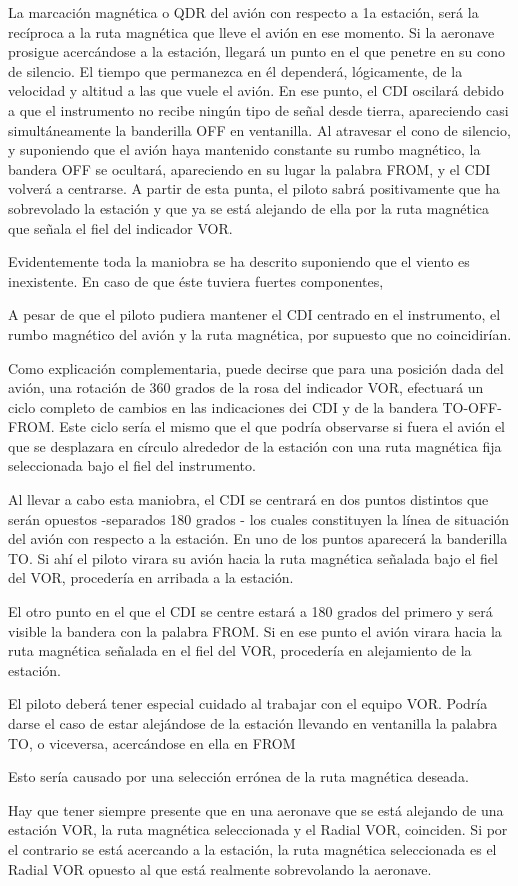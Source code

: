 La marcación magnética o QDR del avión con respecto a 1a estación, será la recíproca a la ruta magnética que lleve el avión en ese momento. Si la aeronave prosigue acercándose a la estación, llegará un punto en el que penetre en su cono de silencio. El tiempo que permanezca en él dependerá, lógicamente, de la velocidad y altitud a las que vuele el avión. En ese punto, el CDI oscilará debido a que el instrumento no recibe ningún tipo de señal desde tierra, apareciendo casi simultáneamente la banderilla OFF en ventanilla. Al atravesar el cono de silencio, y suponiendo que el avión haya mantenido constante su rumbo magnético, la bandera OFF se ocultará, apareciendo en su lugar la palabra FROM, y el CDI volverá a centrarse. A partir de esta punta, el piloto sabrá positivamente que ha sobrevolado la estación y que ya se está alejando de ella por la ruta magnética que señala el fiel del indicador VOR.

Evidentemente toda la maniobra se ha descrito suponiendo que el viento es inexistente. En caso de que éste tuviera fuertes componentes,

A pesar de que el piloto pudiera mantener el CDI centrado en el instrumento, el rumbo magnético del avión y la ruta magnética, por supuesto que no coincidirían.

Como explicación complementaria, puede decirse que para una posición dada del avión, una rotación de 360 grados  de la rosa del indicador VOR, efectuará un ciclo completo de cambios en las indicaciones dei CDI y de la bandera TO-OFF-FROM. Este ciclo sería el mismo que el que podría observarse si fuera el avión el que se desplazara en círculo alrededor de la estación con una ruta magnética fija seleccionada bajo el fiel del instrumento.

Al llevar a cabo esta maniobra, el CDI se centrará en dos puntos distintos que serán opuestos -separados 180 grados  - los cuales constituyen la línea de situación del avión con respecto a la estación. En uno de los puntos aparecerá la banderilla TO. Si ahí el piloto virara su avión hacia la ruta magnética señalada bajo el fiel del VOR, procedería en arribada a la estación.

El otro punto en el que el CDI se centre estará a 180 grados del primero y  será visible la bandera con la palabra FROM. Si en ese punto el avión virara hacia la ruta magnética señalada en el fiel del VOR, procedería en alejamiento de la estación. 

El piloto deberá tener especial cuidado al trabajar con el equipo VOR. Podría darse el caso de estar alejándose de la estación llevando en ventanilla la palabra TO, o viceversa, acercándose en ella en FROM

Esto sería causado por una selección errónea de la ruta magnética deseada. 

Hay que tener siempre presente que en una aeronave que se está alejando de una estación VOR, la ruta magnética seleccionada y el Radial VOR, coinciden. Si por el contrario se está acercando a la estación, la ruta magnética seleccionada es el Radial VOR opuesto al que está realmente sobrevolando la aeronave.
